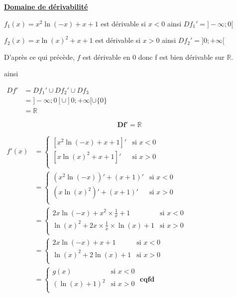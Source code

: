 \documentclass[12pt,a4paper]{article}
\begin{document}
\begin{enumerate}
\textbf{\underline{Domaine de dérivabilité}}

\( f_{1}(x)=x^2 \ln(-x) + x + 1 \) est dérivable si \( x < 0 \) ainsi \( Df_{1}' = ]-\infty;0[\) 

\( f_{2}(x)=x \ln(x)^2 + x + 1  \) est dérivable si \(  x > 0 \) ainsi \( Df_{2}' = ]0;+\infty[\) 

D'après ce qui précède, \(f\) est dérivable en 0 donc f est bien dérivable sur \(\mathbb{R}\).

ainsi 

\( 
\begin{aligned}
    Df'&=Df_{1}' \cup Df_{2}' \cup Df_{3}\\
        &=]-\infty;0[ \cup ]0;+\infty[ \cup  \{0\}\\
        &=\mathbb{R}
\end{aligned} 
\)

\begin{resultbox}
    \[
        \mathbf{Df'=\mathbb{R} }
    \]
\end{resultbox} 

\(
\begin{aligned}
        f'(x) &=
    \begin{cases}
        [x^2 \ln(-x) + x + 1]' & \text{si } x < 0 \\
        [x \ln(x)^2 + x + 1]'  & \text{si } x > 0 \\
    \end{cases}\\
    &=
    \begin{cases}
        (x^2 \ln(-x))' + (x + 1)' & \text{si } x < 0 \\
        (x \ln(x)^2)' + (x + 1)'  & \text{si } x > 0 \\
    \end{cases}\\
    &=
    \begin{cases}
        2x \ln(-x) + x^2\times\frac{1}{x} + 1 & \text{si } x < 0 \\
        \ln(x)^2+2x\times\frac{1}{x}\times\ln(x) + 1  & \text{si } x > 0 \\
    \end{cases}\\
    &=
    \begin{cases}
        2x \ln(-x) + x + 1 & \text{si } x < 0 \\
        \ln(x)^2+2\ln(x) + 1  & \text{si } x > 0 \\
    \end{cases}\\
    &=
    \begin{cases}
        g(x) & \text{si } x < 0 \\
        (\ln(x)+1)^{2}  & \text{si } x > 0 \\
    \end{cases}\textbf{ cqfd}
\end{aligned}
\)


\end{enumerate}
\end{document}
